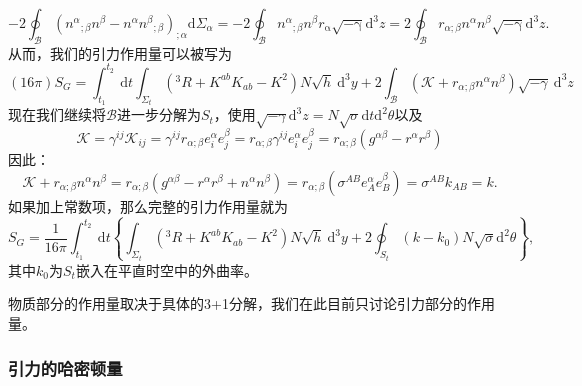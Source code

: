 \documentclass[hyperref, UTF8, a4paper]{ctexart}
\begin{document}
\begin{equation*}
	-2\oint _{\mathscr{B}} (n^{\alpha }{}_{;\beta } n^{\beta } -n^{\alpha } n^{\beta }{}_{;\beta } )_{;\alpha }\mathrm{d} \Sigma _{\alpha } =-2\oint _{\mathscr{B}} n^{\alpha }{}_{;\beta } n^{\beta } r\mathrm{_{\alpha }\sqrt{-\gamma } d}^{3} z=2\oint _{\mathscr{B}} r_{\alpha ;\beta } n^{\alpha } n^{\beta }\mathrm{\sqrt{-\gamma } d}^{3} z.
\end{equation*}
从而，我们的引力作用量可以被写为
\begin{equation*}
	(16\pi )S_{G} =\int _{t_{1}}^{t_{2}} \ \mathrm{d} t\int _{\Sigma _{t}} (^{3} R+K^{ab} K_{ab} -K^{2} )N\sqrt{h} \ \mathrm{d}^{3} y+2\int _{\mathscr{B}}\left(\mathscr{K} +r_{\alpha ;\beta } n^{\alpha } n^{\beta }\right)\sqrt{-\gamma } \ \mathrm{d}^{3} z
\end{equation*}
现在我们继续将$\mathscr{B}$进一步分解为$S_{t}$，使用$\sqrt{-\gamma }\mathrm{d}^{3} z=N\sqrt{\sigma }\mathrm{d} t\mathrm{d}^{2} \theta $以及
\begin{equation*}
	\mathscr{K} =\gamma ^{ij}\mathscr{K}_{ij} =\gamma ^{ij} r_{\alpha ;\beta } e_{i}^{\alpha } e_{j}^{\beta } =r_{\alpha ;\beta } \gamma ^{ij} e_{i}^{\alpha } e_{j}^{\beta } =r_{\alpha ;\beta } (g^{\alpha \beta } -r^{\alpha } r^{\beta } )
\end{equation*}
因此：
\begin{equation*}
	\mathscr{K} +r_{\alpha ;\beta } n^{\alpha } n^{\beta } =r_{\alpha ;\beta } (g^{\alpha \beta } -r^{\alpha } r^{\beta } +n^{\alpha } n^{\beta } )=r_{\alpha ;\beta } (\sigma ^{AB} e_{A}^{\alpha } e_{B}^{\beta } )=\sigma ^{AB} k_{AB} =k.
\end{equation*}
如果加上常数项，那么完整的引力作用量就为
\begin{equation*}
	\boxed{S_{G} =\frac{1}{16\pi }\int _{t_{1}}^{t_{2}} \ \mathrm{d} t\left\{\int _{\Sigma _{t}} (^{3} R+K^{ab} K_{ab} -K^{2} )N\sqrt{h} \ \mathrm{d}^{3} y+2\oint _{S_{t}}( k-k_{0}) N\sqrt{\sigma }\mathrm{d}^{2} \theta \right\}} ,
\end{equation*}
其中$k_{0}$为$S_{t}$嵌入在平直时空中的外曲率。



物质部分的作用量取决于具体的3+1分解，我们在此目前只讨论引力部分的作用量。


\subsubsection{引力的哈密顿量}
\end{document}
